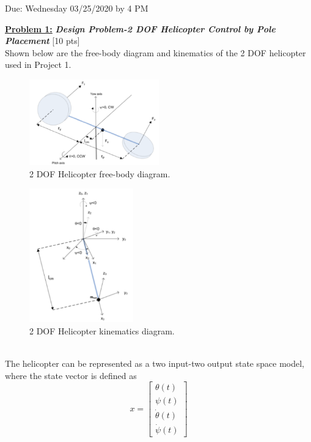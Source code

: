 \documentclass[12pt,letterpaper,onecolumn]{report}
\begin{document}
\begin{center}
Due: Wednesday 03/25/2020 by 4 PM
\\

\end{center}
\noindent\textbf{\underline{Problem 1:}}  
 \textbf{\textit{Design Problem-2 DOF Helicopter Control by Pole Placement}} [10 pts]\\
Shown below are the free-body diagram and kinematics of the 2 DOF helicopter used in Project 1.\\
\begin{figure}[ht]
\begin{center}
\includegraphics[width=0.5\textwidth]{Figures/helifbd.png}
\caption{2 DOF Helicopter free-body diagram.}
\end{center}
\end{figure}
\begin{figure}[ht]
\begin{center}
\includegraphics[width=0.40\textwidth]{Figures/helik.png}
\caption{2 DOF Helicopter kinematics diagram.}
\end{center}
\end{figure}\\
\newpage
\noindent The helicopter can be represented as a two input-two output state space model, where the state vector is defined as
$$ x=\begin{bmatrix}
\theta(t)\\\psi(t)\\\dot{\theta}(t)\\\dot{\psi}(t)
\end{bmatrix}
$$ 
\end{document}
